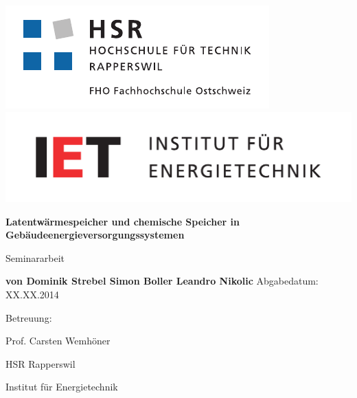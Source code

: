 
\begin{titlepage}
\begin{center}
\includegraphics[scale=0.8]{images/HSR.pdf}
\linebreak \includegraphics[scale=0.3]{images/IET.pdf}
\end{center}

\vspace{2.5cm}
\begin{center}
\textbf{Latentwärmespeicher und chemische Speicher
in Gebäudeenergieversorgungssystemen}
\linebreak
\end{center}
\vspace{1.8cm}
\begin{center}
Seminararbeit
\end{center}
\vspace{1cm}
\begin{center}
\textbf{von \linebreak Dominik Strebel \linebreak Simon Boller \linebreak
Leandro Nikolic} \linebreak
\linebreak 
Abgabedatum: XX.XX.2014
\linebreak
\end{center}
\vspace{3cm}
\noindent Betreuung:

\noindent Prof. Carsten Wemhöner

\noindent HSR Rapperswil

\noindent Institut für Energietechnik

\end{titlepage}
\renewcommand{\footrulewidth}{0pt}
\renewcommand{\headrulewidth}{0pt}
\lhead{}
\chead{}
\rhead{}
\cfoot{} 


